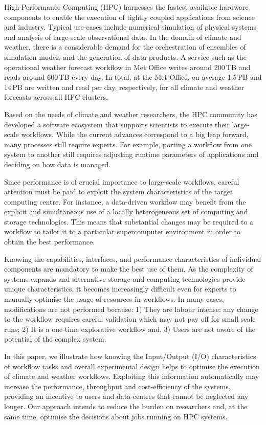 \documentclass{superfri}
\begin{document}
High-Performance Computing (HPC) harnesses the fastest available hardware components to enable the execution of tightly coupled applications from science and industry.
Typical use-cases include numerical simulation of physical systems and analysis of large-scale observational data.
In the domain of climate and weather, there is a considerable demand for the orchestration of ensembles of simulation models and the generation of data products.
A service such as the operational weather forecast workflow in Met Office writes around 200\,TB and reads around 600\,TB every day.
In total, at the Met Office, on average 1.5\,PB and 14\,PB are written and read per day, respectively, for all climate and weather forecasts across all HPC clusters.

Based on the needs of climate and weather researchers, the HPC community has developed a software ecosystem that supports scientists to execute their large-scale workflows.
While the current advances correspond to a big leap forward, many processes still require experts.
For example, porting a workflow from one system to another still requires adjusting runtime parameters of applications and deciding on how data is managed.

Since performance is of crucial importance to large-scale workflows, careful attention must be paid to exploit the system characteristics of the target computing centre.
For instance, a data-driven workflow may benefit from the explicit and simultaneous use of a locally heterogeneous set of computing and storage technologies.
This means that substantial changes may be required to a workflow to tailor it to a particular supercomputer environment in order to obtain the best performance.

Knowing the capabilities, interfaces, and performance characteristics of individual components are mandatory to make the best use of them.
As the complexity of systems expands and alternative storage and computing technologies provide unique characteristics, it becomes increasingly difficult even for experts to manually optimise the usage of resources in workflows. In many cases, modifications are not performed because: 1) They are labour intense: any change to the workflow requires careful validation which may not pay off for small scale runs; 2) It is a one-time explorative workflow and, 3) Users are not aware of the potential of the complex system.

In this paper, we illustrate how knowing the Input/Output (I/O) characteristics of workflow tasks and overall experimental design helps to optimise the execution of climate and weather workflows.
Exploiting this information automatically may increase the performance, throughput and cost-efficiency of the systems, providing an incentive to users and data-centres that cannot be neglected any longer.
Our approach intends to reduce the burden on researchers and, at the same time, optimise the decisions about jobs running on HPC systems.
\end{document}

